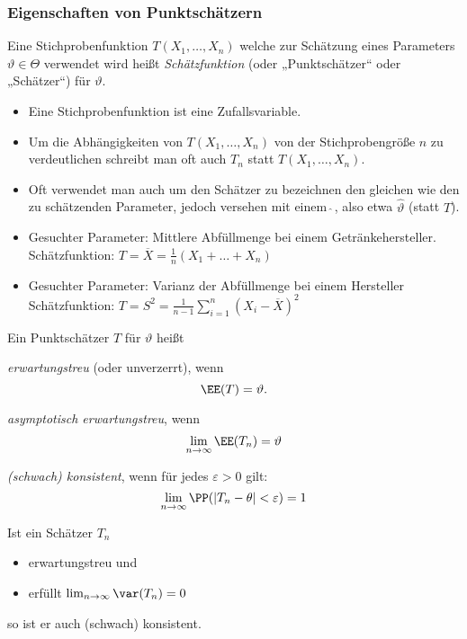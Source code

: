 \subsubsection{Eigenschaften von Punktschätzern}

 Eine Stichprobenfunktion $T(X_1,\ldots, X_n)$ welche zur Schätzung eines Parameters $\vartheta \in \Theta$ verwendet wird heißt \emph{Schätzfunktion} (oder „Punktschätzer“ oder „Schätzer“) für $\vartheta$.

\begin{itemize}
\item Eine Stichprobenfunktion ist eine Zufallsvariable.
\item Um die Abhängigkeiten von $T(X_1,\ldots, X_n)$ von der Stichprobengröße $n$ zu verdeutlichen schreibt man oft auch $T_n$ statt $T(X_1, \ldots, X_n)$.
\item Oft verwendet man auch um den Schätzer zu bezeichnen den gleichen wie den zu schätzenden Parameter, jedoch versehen mit einem $\hat{\;}$, also etwa $\hat{\vartheta}$ (statt $T$).
\end{itemize}

\begin{itemize}
\item Gesuchter Parameter: Mittlere Abfüllmenge bei einem Getränkehersteller.\\
Schätzfunktion: $T=\overline{X}=\frac{1}{n}(X_1+\ldots + X_n)$
\item Gesuchter Parameter: Varianz der Abfüllmenge bei einem Hersteller\\
Schätzfunktion: $T=S^2=\frac{1}{n-1}\sum_{i=1}^n (X_i-\overline{X})^2$
\end{itemize}

Ein Punktschätzer $T$ für $\vartheta$ heißt
\begin{anumerate}
\item \emph{erwartungstreu} (oder unverzerrt), wenn 
$$\EE(T)=\vartheta\text{.}$$
\item \emph{asymptotisch erwartungstreu}, wenn
$$\lim_{n\to \infty} \EE(T_n)=\vartheta$$
\item \emph{(schwach) konsistent}, wenn für jedes $\varepsilon > 0$ gilt:
$$\lim_{n\to \infty}\PP(|T_n-\theta| < \varepsilon) = 1$$
\end{anumerate}

 Ist ein Schätzer $T_n$
\begin{itemize}
\item erwartungstreu und 
\item erfüllt $\lim_{n\to \infty} \var (T_n) = 0$
\end{itemize}
so ist er auch (schwach) konsistent.

